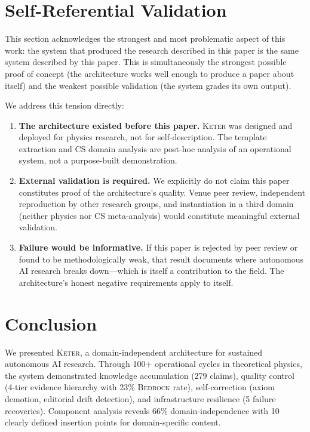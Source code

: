 \documentclass[11pt,a4paper]{article}
\newcommand{\keter}{\textsc{Keter}}
\newcommand{\bedrock}{\textsc{Bedrock}}
\begin{document}
\section{Self-Referential Validation}
\label{sec:self_ref}

This section acknowledges the strongest and most problematic aspect of this work:
the system that produced the research described in this paper is the same system
described by this paper. This is simultaneously the strongest possible proof of
concept (the architecture works well enough to produce a paper about itself) and
the weakest possible validation (the system grades its own output).

We address this tension directly:

\begin{enumerate}[nosep]
    \item \textbf{The architecture existed before this paper.} \keter{} was
          designed and deployed for physics research, not for self-description.
          The template extraction and CS domain analysis are post-hoc analysis
          of an operational system, not a purpose-built demonstration.
    \item \textbf{External validation is required.} We explicitly do not claim
          this paper constitutes proof of the architecture's quality. Venue
          peer review, independent reproduction by other research groups, and
          instantiation in a third domain (neither physics nor CS meta-analysis)
          would constitute meaningful external validation.
    \item \textbf{Failure would be informative.} If this paper is rejected by
          peer review or found to be methodologically weak, that result
          documents where autonomous AI research breaks down---which is itself
          a contribution to the field. The architecture's honest negative
          requirements apply to itself.
\end{enumerate}

\section{Conclusion}
\label{sec:conclusion}

We presented \keter{}, a domain-independent architecture for sustained autonomous
AI research. Through 100+ operational cycles in theoretical physics, the system
demonstrated knowledge accumulation (279 claims), quality control (4-tier evidence
hierarchy with 23\% \bedrock{} rate), self-correction (axiom demotion, editorial
drift detection), and infrastructure resilience (5 failure recoveries). Component
analysis reveals 66\% domain-independence with 10 clearly defined insertion points
for domain-specific content.
\end{document}
